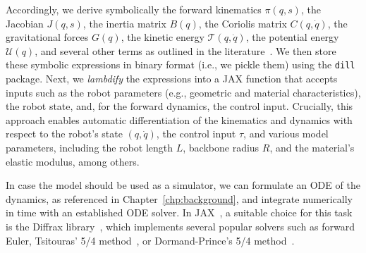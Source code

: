 Accordingly, we derive symbolically the forward kinematics $\pi(q, s)$, the Jacobian $J(q, s)$, the inertia matrix $B(q)$, the Coriolis matrix $C(q, \dot{q})$, the gravitational forces $G(q)$, the kinetic energy $\mathcal{T}(q, \dot{q})$, the potential energy $\mathcal{U}(q)$, and several other terms as outlined in the literature~\citep{della2023model, stolzle2024experimental}. We then store these symbolic expressions in binary format (i.e., we pickle them) using the \texttt{dill} package. Next, we \emph{lambdify} the expressions into a JAX function that accepts inputs such as the robot parameters (e.g., geometric and material characteristics), the robot state, and, for the forward dynamics, the control input. Crucially, this approach enables automatic differentiation of the kinematics and dynamics with respect to the robot’s state $(q, \dot{q})$, the control input $\tau$, and various model parameters, including the robot length $L$, backbone radius $R$, and the material’s elastic modulus, among others.

In case the model should be used as a simulator, we can formulate an \gls{ODE} of the dynamics, as referenced in Chapter~\ref{chp:background}, and integrate numerically in time with an established \gls{ODE} solver. In JAX~\citep{jax2018github}, a suitable choice for this task is the Diffrax library~\citep{kidger2021neural}, which implements several popular solvers such as forward Euler, Tsitouras' 5/4 method~\citep{tsitouras2011runge}, or Dormand-Prince's 5/4 method~\citep{dormand1980family}.


